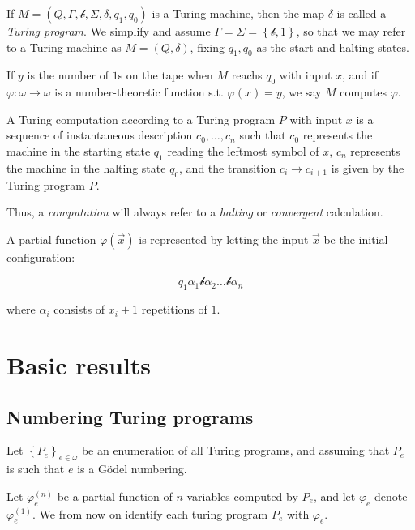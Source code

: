 \documentclass[a4paper, 12pt]{article}
\begin{document}
If $M = (Q, \Gamma, \mathcal{b}, \Sigma, \delta, q_1, q_0)$ is a Turing machine,
then the map $\delta$ is called a \textit{Turing program}. 
We simplify and assume $\Gamma = \Sigma = \left\{ \mathcal{b}, 1 \right\} $, 
so that we may refer to a Turing machine as 
$M = (Q, \delta)$, fixing $q_1, q_0$ as the start and 
halting states.

If $y$ is the number of $1$s on the tape when $M$ reachs 
$q_0$ with input $x$, and if $\varphi : \omega \to \omega$ is a 
number-theoretic function s.t. $\varphi(x) = y$,
we say $M$ computes $\varphi$.

\begin{definition}
    A Turing computation according to a Turing program $P$ with input $x$
    is a sequence of instantaneous description $c_0, \ldots, c_n$ such that 
    $c_0$ represents the machine in the starting state $q_1$ reading 
    the leftmost symbol of $x$, $c_n$ represents the machine in the 
    halting state $q_0$, and the transition $c_i \to  c_{i+1}$ 
    is given by the Turing program $P$.
\end{definition}

Thus, a \textit{computation} will always refer to a \textit{halting} or 
\textit{convergent} calculation. 

A partial function $\varphi(\overrightarrow{x})$ is represented 
by letting the input $\overrightarrow{x}$ be the initial configuration:

\begin{equation*}
    q_1 \alpha_1 \mathcal{b} \alpha_2 \ldots \mathcal{b} \alpha_n
\end{equation*}

where $\alpha_i$ consists of $x_i + 1$ repetitions of $1$.

\section{Basic results}

\subsection{Numbering Turing programs}

Let $\left\{ P_e \right\}_{e \in \omega} $ be an enumeration of all Turing 
programs, and assuming that $P_e$ is such that $e$
is a Gödel numbering. 

Let $\varphi_e^{(n)}$ be a partial function of $n$ variables 
computed by $P_e$, and let $\varphi_e$ denote $\varphi_e^{(1)}$.
We from now on identify each turing program $P_e$
with $\varphi_e$. 
\end{document}
